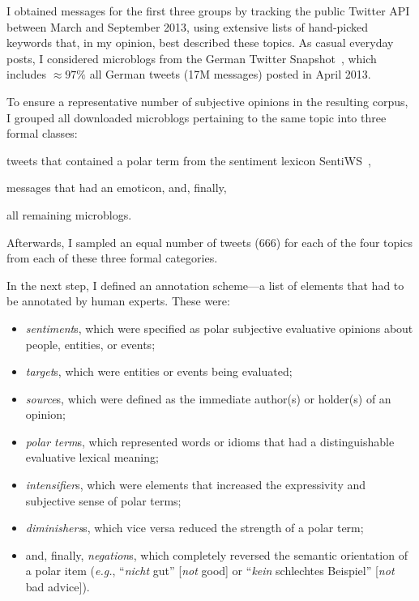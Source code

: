 \documentclass[11pt]{article}
\newcommand{\eg}{\textit{e.g.},}
\renewcommand{\cite}{\citep}
\begin{document}
I obtained messages for the first three groups by tracking the public
Twitter API between March and September 2013, using extensive lists of
hand-picked keywords that, in my opinion, best described these topics.
As casual everyday posts, I considered microblogs from the German
Twitter Snapshot~\cite{Scheffler:14}, which includes $\approx97\%$ all
German tweets (17M messages) posted in April 2013.

To ensure a representative number of subjective opinions in the
resulting corpus, I grouped all downloaded microblogs pertaining to
the same topic into three formal classes:
\begin{inparaenum}[(i)]
  \item tweets that contained a polar term from the sentiment lexicon
    SentiWS~\cite{Remus:10},
  \item messages that had an emoticon, and, finally,
  \item all remaining microblogs.
\end{inparaenum}
Afterwards, I sampled an equal number of tweets (666) for each of the
four topics from each of these three formal categories.

In the next step, I defined an annotation scheme---a list of elements
that had to be annotated by human experts.  These were:
\begin{itemize}
  \item\emph{sentiment}s, which were specified as polar subjective
    evaluative opinions about people, entities, or events;

  \item\emph{target}s, which were entities or events being evaluated;

  \item\emph{source}s, which were defined as the immediate author(s)
    or holder(s) of an opinion;

  \item\emph{polar term}s, which represented words or idioms that had
    a distinguishable evaluative lexical meaning;

  \item\emph{intensifier}s, which were elements that increased the
    expressivity and subjective sense of polar terms;

  \item\emph{diminishers}s, which vice versa reduced the strength of a
    polar term;

  \item and, finally, \emph{negation}s, which completely reversed the
    semantic orientation of a polar item (\eg{} ``\emph{nicht} gut''
    [\emph{not} good] or ``\emph{kein} schlechtes Beispiel''
    [\emph{not} bad advice]).
\end{itemize}
\end{document}
